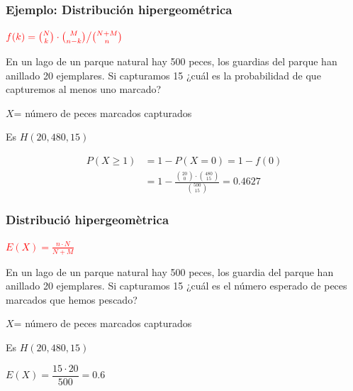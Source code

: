 \documentclass[handout]{beamer}\usepackage[]{graphicx}\usepackage[]{color}
\newcommand{\red}[1]{\textcolor{red}{#1}}
\newcommand{\NN}{\mathbb{N}}
\renewcommand{\leq}{\leqslant}
\renewcommand{\geq}{\geqslant}
\theoremstyle{plain}
\theoremstyle{definition}
\begin{document}
\begin{frame}
\end{frame}

\begin{frame}
\frametitle{Ejemplo: Distribución hipergeométrica}

$\red{f(k)= \binom{N}{k}\cdot \binom{M}{n-k}\big/\binom{N+M}{n}}$
\medskip


En un lago de un parque natural  hay  500 peces, los guardias del parque han anillado 20 ejemplares. Si capturamos 15 ¿cuál es la probabilidad de que capturemos al menos uno marcado?
\medskip

$X$= número de peces marcados capturados
\medskip

Es $H(20,480,15)$
\medskip

$$
\begin{array}{rl}
P(X\geq 1) & =1-P(X=0)=1-f(0)\\[2ex]
& \displaystyle =1-\frac{\binom{20}{0}\cdot \binom{480}{15}}{\binom{500}{15}}=0.4627
\end{array}
$$



\end{frame}


\begin{frame}
\frametitle{Distribució hipergeomètrica}

\red{$E(X)=\frac{n\cdot N}{N+M}$}
\medskip

En un lago de un parque natural  hay  500 peces, los guardia del parque han anillado 20 ejemplares. Si capturamos 15 ¿cuál es el número esperado de  peces marcados que hemos pescado?
\medskip

$X$= número de peces marcados capturados

Es $H(20,480,15)$
\medskip

$E(X)=\dfrac{15\cdot 20}{500}=0.6$

\end{frame}
\end{document}

